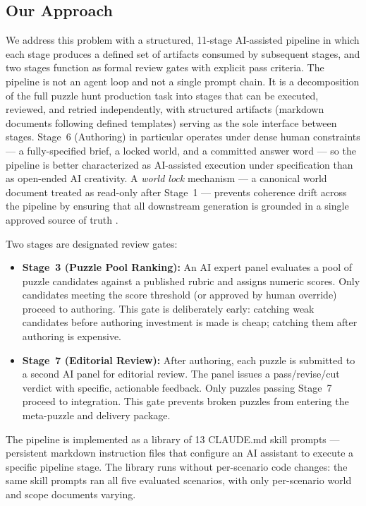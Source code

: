 \subsection*{Our Approach}

We address this problem with a structured, 11-stage AI-assisted pipeline in which each stage
produces a defined set of artifacts consumed by subsequent stages, and two stages function as
formal review gates with explicit pass criteria. The pipeline is not an agent loop and not a
single prompt chain. It is a decomposition of the full puzzle hunt production task into
stages that can be executed, reviewed, and retried independently, with structured artifacts
(markdown documents following defined templates) serving as the sole interface between
stages. Stage~6 (Authoring) in particular operates under dense human constraints --- a
fully-specified brief, a locked world, and a committed answer word --- so the pipeline is
better characterized as AI-assisted execution under specification than as open-ended AI
creativity. A \emph{world lock} mechanism --- a canonical world document treated as read-only
after Stage~1 --- prevents coherence drift across the pipeline by ensuring that all
downstream generation is grounded in a single approved source of truth
\cite{smith2010tanagra}.

Two stages are designated review gates:

\begin{itemize}
  \item \textbf{Stage~3 (Puzzle Pool Ranking):} An AI expert panel evaluates a pool of
  puzzle candidates against a published rubric and assigns numeric scores. Only candidates
  meeting the score threshold (or approved by human override) proceed to authoring. This
  gate is deliberately early: catching weak candidates before authoring investment is made
  is cheap; catching them after authoring is expensive.

  \item \textbf{Stage~7 (Editorial Review):} After authoring, each puzzle is submitted to a
  second AI panel for editorial review. The panel issues a pass/revise/cut verdict with
  specific, actionable feedback. Only puzzles passing Stage~7 proceed to integration. This
  gate prevents broken puzzles from entering the meta-puzzle and delivery package.
\end{itemize}

The pipeline is implemented as a library of 13 CLAUDE.md skill prompts --- persistent
markdown instruction files that configure an AI assistant to execute a specific pipeline
stage. The library runs without per-scenario code changes: the same skill prompts ran all
five evaluated scenarios, with only per-scenario world and scope documents varying.

